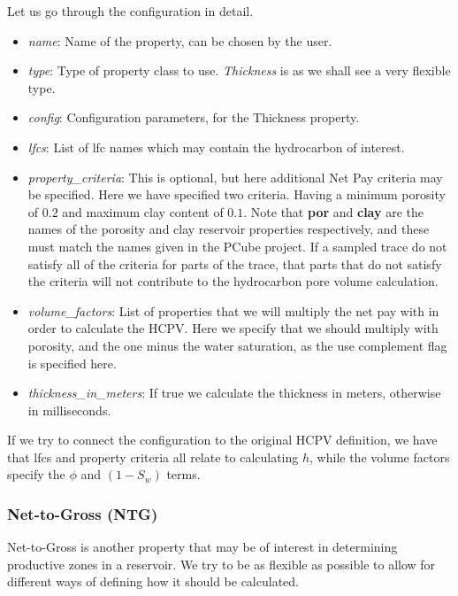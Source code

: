 \documentclass[note,screen,english,12pt,utf8]{nrdoc}
\begin{document}
Let us go through the configuration in detail.
\begin{itemize}
    \item \emph{name}: Name of the property, can be chosen by the user.
    \item{\emph{type}: Type of property class to use. \emph{Thickness} is as we shall see a very flexible type.}
    \item \emph{config}: Configuration parameters, for the Thickness property.
    \item \emph{lfcs}: List of lfc names which may contain the hydrocarbon of interest.
    \item {
        \emph{property\_criteria}: This is optional, but here additional Net Pay criteria may be
        specified. Here we have specified two criteria. Having a minimum porosity of $0.2$
        and maximum clay content of $0.1$. Note that \textbf{por} and \textbf{clay} are the names
        of the porosity and clay reservoir properties respectively, and these must
        match the names given in the PCube project. If a sampled trace do not satisfy
        all of the criteria for parts of the trace, that parts that do not satisfy the
        criteria will not contribute to the hydrocarbon pore volume calculation.
    }
    \item {
        \emph{volume\_factors}: List of properties that we will multiply the
        net pay with in order to calculate the HCPV. Here we specify that
        we should multiply with porosity, and the one minus the water saturation,
        as the use complement flag is specified here.
    }
    \item \emph{thickness\_in\_meters}: If true we calculate the thickness in meters, otherwise in milliseconds.
\end{itemize}

If we try to connect the configuration to the original HCPV definition, we
have that lfcs and property criteria all relate to calculating $h$, while
the volume factors specify the $\phi$ and $(1 - S_w)$ terms.

\subsubsection{Net-to-Gross (NTG)}

Net-to-Gross is another property that may be of interest in determining
productive zones in a reservoir.
We try to be as flexible as possible to allow for different ways of
defining how it should be calculated.
\end{document}
